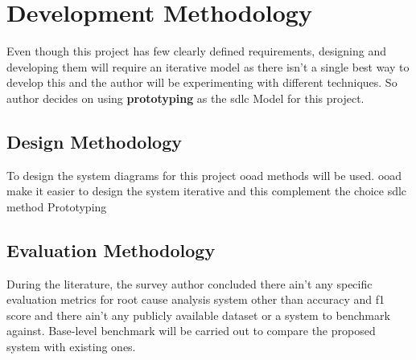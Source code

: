 {\let\clearpage\relax \chapter{Development Methodology}}

Even though this project has few clearly defined requirements, designing and developing them will require an iterative model as there isn't a single best way to develop this and the author will be experimenting with different techniques. So author decides on using \textbf{prototyping} as the \ac{sdlc} Model for this project.

\section{Design Methodology}

To design the system diagrams for this project \ac{ooad} methods will be used. \ac{ooad} make it easier to design the system iterative and this complement the choice \ac{sdlc} method Prototyping

\section{Evaluation Methodology}

During the literature, the survey author concluded there ain't any specific evaluation metrics for root cause analysis system other than accuracy and f1 score and there ain't any publicly available dataset or a system to benchmark against. Base-level benchmark will be carried out to compare the proposed system with existing ones.
